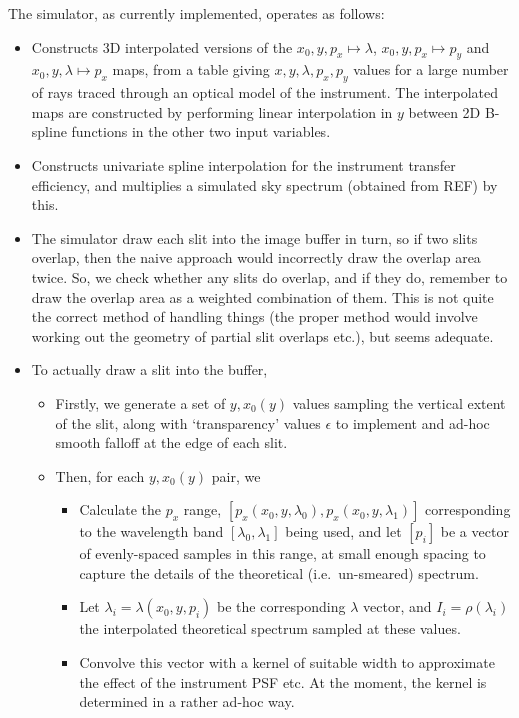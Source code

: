 The simulator, as currently implemented, operates as follows:
%
\begin{itemize}
\item Constructs 3D interpolated versions of the $x_0, y, p_x \mapsto
\lambda$, $x_0, y, p_x \mapsto p_y$ and $x_0, y, \lambda \mapsto p_x$
maps, from a table giving $x, y, \lambda, p_x, p_y$ values for a large
number of rays traced through an optical model of the instrument. The
interpolated maps are constructed by performing linear interpolation in
$y$ between 2D B-spline functions in the other two input variables.
%
\item Constructs univariate spline interpolation for the instrument
transfer efficiency, and multiplies a simulated sky spectrum (obtained from REF)
by this.
%
\item
The simulator draw each slit into the image buffer in turn, so if two
slits overlap, then the naive approach would incorrectly draw the
overlap area twice. So, we check whether any slits do overlap, and if
they do, remember to draw the overlap area as a weighted combination
of them. This is not quite the correct method of handling things (the
proper method would involve working out the geometry of partial slit
overlaps etc.), but seems adequate.
%
\item
To actually draw a slit into the buffer,
\begin{itemize}
\item Firstly, we generate a set of $y, x_0(y)$ values sampling the vertical
extent of the slit, along with `transparency' values $\epsilon$ to implement
and ad-hoc smooth falloff at the edge of each slit.
%
\item Then, for each $y, x_0(y)$ pair, we
\begin{itemize}
\item Calculate the $p_x$ range, $[p_x(x_0, y, \lambda_0), p_x (x_0, y, \lambda_1)]$
corresponding to the wavelength band $[\lambda_0, \lambda_1]$ being used, and
let $[p_i]$ be a vector of evenly-spaced samples in this range, at small enough
spacing to capture the details of the theoretical (i.e.\ un-smeared) spectrum.
%
\item Let $\lambda_i = \lambda (x_0, y, p_i)$ be the corresponding
$\lambda$ vector, and $I_i = \rho (\lambda_i)$ the interpolated
theoretical spectrum sampled at these values.
%
\item Convolve this vector with a kernel of suitable width to
approximate the effect of the instrument PSF etc. At the moment, the
kernel is determined in a rather ad-hoc way.

\end{itemize}
\end{itemize}
\end{itemize}
